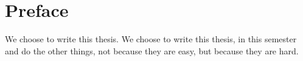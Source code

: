 \chapter*{Preface}\label{chapter:preface}

We choose to write this thesis. We choose to write this thesis, in this semester and do the other things, not because they are easy, but because they are hard. 
